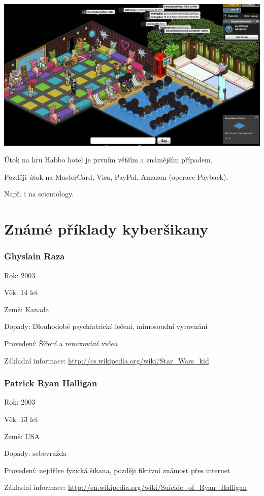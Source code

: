 \documentclass[xetex]{beamer}
\begin{document}
\begin{frame}
	\includegraphics[scale=0.25]{habbo-hotel.jpg}
\end{frame}

\begin{frame}
	Útok na hru Habbo hotel je prvním větším a známějším případem.

	\bigskip

	Později útok na MasterCard, Visa, PayPal, Amazon (operace Payback).

	\bigskip

	Např. i na scientology.
\end{frame}

\section{Známé příklady kyberšikany}
\begin{frame}
  \frametitle{Ghyslain Raza}

	Rok: 2003
	
	Věk: 14 let

	Země: Kanada

	Dopady: Dlouhodobé psychiatrické lečení, mimosoudní vyrovnání

	Provedení: Šíření a remixování videa

	Základní informace: \url{http://cs.wikipedia.org/wiki/Star\_Wars\_kid}
\end{frame}

\begin{frame}
	\frametitle{Patrick Ryan Halligan}
	
	Rok: 2003

	Věk: 13 let

	Země: USA

	Dopady: sebevražda

	Provedení: nejdříve fyzická šikana, později fiktivní známost přes internet

	Základní informace: \url{http://en.wikipedia.org/wiki/Suicide\_of\_Ryan\_Halligan}
\end{frame}
\end{document}
